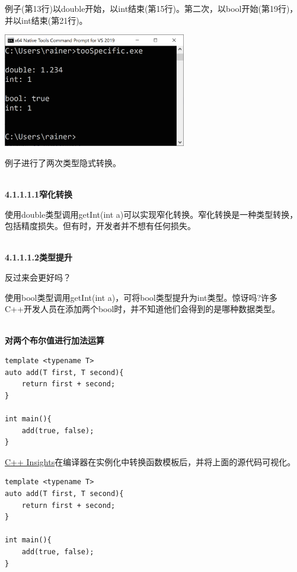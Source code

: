 例子(第13行)以double开始，以int结束(第15行)。第二次，以bool开始(第19行)，并以int结束(第21行)。

\begin{center}
\includegraphics[width=0.6\textwidth]{content/3/chapter4/images/3.png}\\
\end{center}

例子进行了两次类型隐式转换。

\hspace*{\fill} \\ %
\noindent
\textbf{4.1.1.1.1\hspace{0.2cm}窄化转换}

使用double类型调用getInt(int a)可以实现窄化转换。窄化转换是一种类型转换，包括精度损失。但有时，开发者并不想有任何损失。

\hspace*{\fill} \\ %
\noindent
\textbf{4.1.1.1.2\hspace{0.2cm}类型提升}

反过来会更好吗？

使用bool类型调用getInt(int a)，可将bool类型提升为int类型。惊讶吗?许多C++开发人员在添加两个bool时，并不知道他们会得到的是哪种数据类型。

\hspace*{\fill} \\ %
\noindent
\textbf{对两个布尔值进行加法运算}
\begin{lstlisting}[style=styleCXX]
template <typename T>
auto add(T first, T second){
	return first + second;
}

int main(){
	add(true, false);
}
\end{lstlisting}

\href{https://cppinsights.io/s/9bd14f99}{C++ Insights}在编译器在实例化中转换函数模板后，并将上面的源代码可视化。

\begin{lstlisting}[style=styleCXX]
template <typename T>
auto add(T first, T second){
	return first + second;
}

int main(){
	add(true, false);
}
\end{lstlisting}

